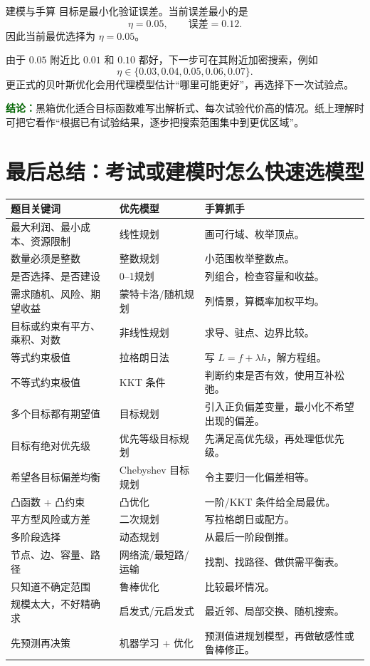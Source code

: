 \documentclass[UTF8,12pt,a4paper]{ctexart}
\newcommand{\conclusion}[1]{\par\smallskip\noindent\textcolor{darkgreen}{\textbf{结论：}}#1\par\smallskip}
\begin{document}
\begin{solbox}{建模与手算}
目标是最小化验证误差。当前误差最小的是
\[
\eta=0.05,
\qquad \text{误差}=0.12.
\]
因此当前最优选择为 $\eta=0.05$。

由于 $0.05$ 附近比 $0.01$ 和 $0.10$ 都好，下一步可在其附近加密搜索，例如
\[
\eta\in\{0.03,0.04,0.05,0.06,0.07\}.
\]
更正式的贝叶斯优化会用代理模型估计“哪里可能更好”，再选择下一次试验点。
\end{solbox}
\conclusion{黑箱优化适合目标函数难写出解析式、每次试验代价高的情况。纸上理解时可把它看作“根据已有试验结果，逐步把搜索范围集中到更优区域”。}

\newpage
\section{最后总结：考试或建模时怎么快速选模型}
\begin{center}
\begin{longtable}{p{3.5cm}p{5.2cm}p{6.0cm}}
\toprule
题目关键词 & 优先模型 & 手算抓手\\
\midrule
最大利润、最小成本、资源限制 & 线性规划 & 画可行域、枚举顶点。\\
数量必须是整数 & 整数规划 & 小范围枚举整数点。\\
是否选择、是否建设 & 0--1规划 & 列组合，检查容量和收益。\\
需求随机、风险、期望收益 & 蒙特卡洛/随机规划 & 列情景，算概率加权平均。\\
目标或约束有平方、乘积、对数 & 非线性规划 & 求导、驻点、边界比较。\\
等式约束极值 & 拉格朗日法 & 写 $L=f+\lambda h$，解方程组。\\
不等式约束极值 & KKT 条件 & 判断约束是否有效，使用互补松弛。\\
多个目标都有期望值 & 目标规划 & 引入正负偏差变量，最小化不希望出现的偏差。\\
目标有绝对优先级 & 优先等级目标规划 & 先满足高优先级，再处理低优先级。\\
希望各目标偏差均衡 & Chebyshev 目标规划 & 令主要归一化偏差相等。\\
凸函数 + 凸约束 & 凸优化 & 一阶/KKT 条件给全局最优。\\
平方型风险或方差 & 二次规划 & 写拉格朗日或配方。\\
多阶段选择 & 动态规划 & 从最后一阶段倒推。\\
节点、边、容量、路径 & 网络流/最短路/运输 & 找割、找路径、做供需平衡表。\\
只知道不确定范围 & 鲁棒优化 & 比较最坏情况。\\
规模太大，不好精确求 & 启发式/元启发式 & 最近邻、局部交换、随机搜索。\\
先预测再决策 & 机器学习 + 优化 & 预测值进规划模型，再做敏感性或鲁棒修正。\\
\bottomrule
\end{longtable}
\end{center}
\end{document}
